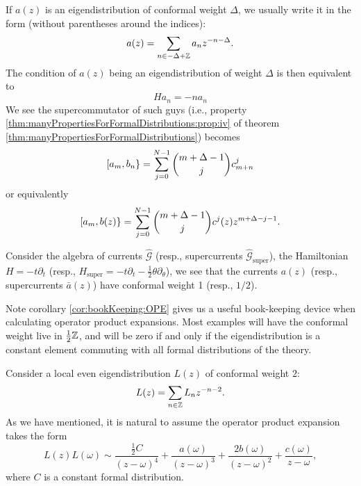 \M
If $a(z)$ is an eigendistribution of conformal weight $\Delta$, we usually
write it in the form (without parentheses around the indices):
\begin{equation}
a(z)=\sum_{n\in-\Delta+\mathbb{Z}}a_{n}z^{-n-\Delta}.
\end{equation}
The condition of $a(z)$ being an eigendistribution of weight $\Delta$ is then 
equivalent to
\begin{equation}
Ha_{n}=-na_{n}
\end{equation}
We see the supercommutator of such guys (i.e., property 
\ref{thm:manyPropertiesForFormalDistributions:prop:iv} of theorem 
\ref{thm:manyPropertiesForFormalDistributions}) becomes
\begin{equation}
[a_{m},b_{n}\}=\sum^{N-1}_{j=0}\binom{m+\Delta-1}{j}c^{j}_{m+n}
\end{equation}
or equivalently
\begin{equation}
[a_{m},b(z)\} = \sum^{N-1}_{j=0}\binom{m+\Delta-1}{j}c^{j}(z)z^{m+\Delta-j-1}.
\end{equation}

Consider the algebra of currents $\widehat{\mathscr{G}}$ (resp., supercurrents 
$\widehat{\mathscr{G}}_{\text{super}}$), the Hamiltonian $H=-t\partial_{t}$ 
(resp., $H_{\text{super}}=-t\partial_{t}-\frac{1}{2}\theta\partial_{\theta}$), 
we see that the currents $a(z)$ (resp., supercurrents $\bar{a}(z)$) have 
conformal weight 1 (resp., $1/2$). 

\M
Note corollary \ref{cor:bookKeeping:OPE} gives us a useful book-keeping device
when calculating operator product expansions. Most examples will have the 
conformal weight live in $\frac{1}{2}\mathbb{Z}$, and will be zero if and only if the
eigendistribution is a constant element commuting with all formal distributions
of the theory.

\M
Consider a local even eigendistribution $L(z)$ of conformal weight $2$:
\begin{equation}
L(z)=\sum_{n\in\mathbb{Z}}L_{n}z^{-n-2}.
\end{equation}
As we have mentioned, it is natural to assume the operator product expansion
takes the form
\begin{equation}\label{eq:OPEforConformalWeightTwoEigendistribution}
L(z)L(\omega)
\sim \frac{\frac{1}{2}C}{(z-\omega)^{4}}
   + \frac{a(\omega)}{(z-\omega)^{3}}
   + \frac{2b(\omega)}{(z-\omega)^{2}}
   + \frac{c(\omega)}{z-\omega},
\end{equation}
where $C$ is a constant formal distribution.

